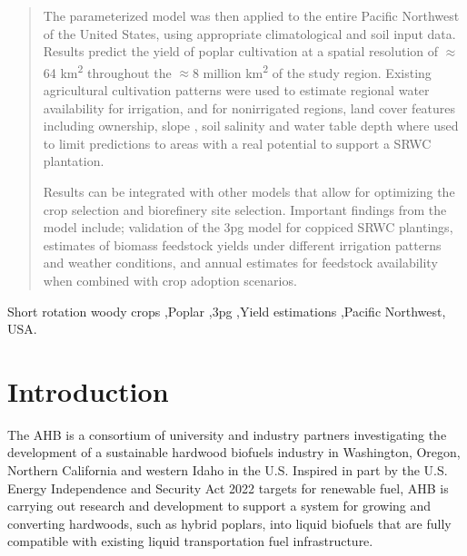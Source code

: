 \documentclass[preprint,12pt]{elsarticle}
\begin{document}
\begin{frontmatter}
\begin{abstract}
  The parameterized model was then applied to the entire Pacific
  Northwest of the United States, using appropriate climatological and
  soil input data.  Results predict the yield of poplar cultivation at
  a spatial resolution of $\approx$ 64 km\textsuperscript{2}
  throughout the $\approx$8 million km\textsuperscript{2} of the study
  region. Existing agricultural cultivation patterns were used to
  estimate regional water availability for irrigation, and for
  nonirrigated regions, land cover features including ownership, slope
  , soil salinity and water table depth where used to limit
  predictions to areas with a real potential to support a \ac{SRWC}
  plantation.

  Results can be integrated with other models that allow for
  optimizing the crop selection and biorefinery site selection.
  Important findings from the model include; validation of the
  \ac{3pg} model for coppiced \ac{SRWC} plantings, estimates of
  biomass feedstock yields under different irrigation patterns and
  weather conditions, and annual estimates for feedstock availability
  when combined with crop adoption scenarios.

\end{abstract}

\begin{keyword}
  Short rotation woody crops \sep Poplar \sep \ac{3pg} \sep Yield
  estimations \sep Pacific Northwest, USA.



\end{keyword}

\end{frontmatter}


\section{Introduction}
\label{sec:introduction}
The \acf{AHB} is a consortium of university and industry partners
investigating the development of a sustainable hardwood biofuels
industry in Washington, Oregon, Northern California and western Idaho
in the U.S.  Inspired in part by the U.S. Energy Independence and
Security Act 2022 targets for renewable fuel, \ac{AHB} is carrying out
research and development to support a system for growing and
converting hardwoods, such as hybrid poplars, into liquid biofuels
that are fully compatible with existing liquid transportation fuel infrastructure.
\end{document}
